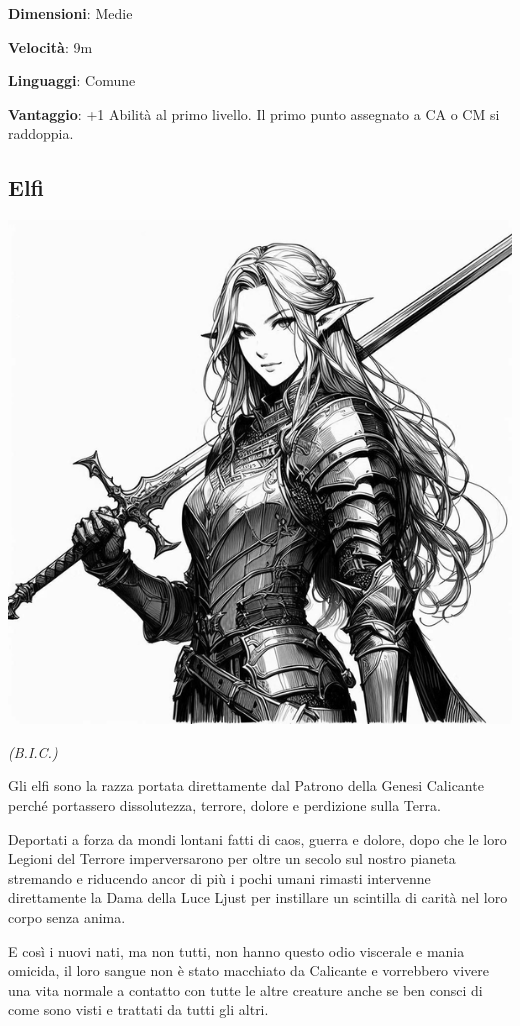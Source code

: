 \begin{multicols}{2}
\textbf{Dimensioni}: Medie

\textbf{Velocità}: 9m

\textbf{Linguaggi}: Comune

\textbf{Vantaggio}: +1 Abilità al primo livello. Il primo punto assegnato a CA o CM si raddoppia.

\subsection{Elfi}\label{elfi}


\begin{center}
\includegraphics[height=0.7\linewidth]{immagini/elfa3-ai.png}

\textit{(B.I.C.)}
\end{center}

Gli elfi sono la razza portata direttamente dal Patrono della Genesi Calicante perché portassero dissolutezza, terrore, dolore e perdizione sulla Terra.

Deportati a forza da mondi lontani fatti di caos, guerra e dolore, dopo che le loro Legioni del Terrore imperversarono per oltre un secolo sul nostro pianeta stremando e riducendo ancor di più i pochi umani rimasti intervenne direttamente la Dama della Luce Ljust per instillare un scintilla di carità nel loro corpo senza anima.

E così i nuovi nati, ma non tutti, non hanno questo odio viscerale e mania omicida, il loro sangue non è stato macchiato da Calicante e vorrebbero vivere una vita normale a contatto con tutte le altre creature anche se ben consci di come sono visti e trattati da tutti gli altri.


\end{multicols}
